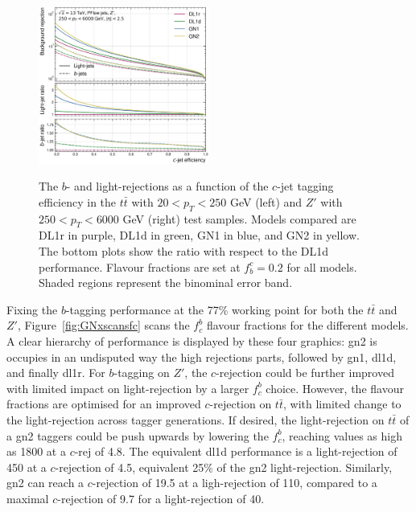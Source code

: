 \begin{center}
\begin{figure}[h!]
{  \includegraphics[width=0.50\textwidth]{Images/FTAG/GN/GN2/rocs/roc_zp_c.png}
  }
  \caption{The $b$- and light-rejections as a function of the $c$-jet tagging efficiency in the $t\bar{t}$ with $20 < p_T < 250$ GeV (left) and $Z'$ with $250 < p_T < 6000$ GeV (right) test samples. Models compared are DL1r in purple, DL1d in green, GN1 in blue, and GN2 in yellow. The bottom plots show the ratio with respect to the DL1d performance. Flavour fractions are set at $f^c_b = 0.2$ for all models. Shaded regions represent the binominal error band.}
  \label{fig:GN2rocc}
  \end{figure}
\end{center}

Fixing the $b$-tagging performance at the 77\% working point for both the $t\bar{t}$ and $Z'$, Figure~\ref{fig:GNxscansfc} scans the $f^b_c$ flavour fractions for the different models. A clear hierarchy of performance is displayed by these four graphics: \gls{gn2} is occupies in an undisputed way the high rejections parts, followed by \gls{gn1}, \gls{dl1d}, and finally \gls{dl1r}. For $b$-tagging on $Z'$, the $c$-rejection could be further improved with limited impact on light-rejection by a larger $f^b_c$ choice. However, the flavour fractions are optimised for an improved $c$-rejection on $t\bar{t}$, with limited change to the light-rejection across tagger generations. If desired, the light-rejection on $t\bar{t}$ of a \gls{gn2} taggers could be push upwards by lowering the $f^b_c$, reaching values as high as 1800 at a $c$-rej of 4.8. The equivalent \gls{dl1d} performance is a light-rejection of 450 at a $c$-rejection of 4.5, equivalent 25\% of the \gls{gn2} light-rejection. Similarly, \gls{gn2} can reach a $c$-rejection of 19.5 at a ligh-rejection of 110, compared to a maximal $c$-rejection of 9.7 for a light-rejection of 40. \\

